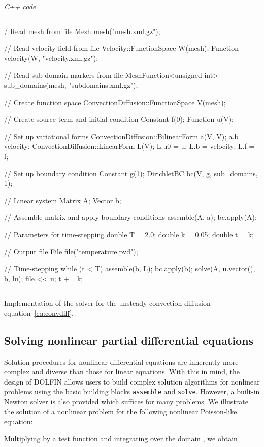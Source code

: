 \documentclass[acmtoms]{acmtrans2m}
\newenvironment{cppcode}[1]{\center\minipage{#1\textwidth}\footnotesize\hfill\it C++ code \rm\vspace{0.1cm}\hrule\renewcommand{\baselinestretch}{0.9}\footnotesize\verbatim}{\endverbatim\hrule\normalsize\endminipage\newline\endcenter}
\newcommand{\emp}[1]{\texttt{#1}}
\newcommand{\dolfin}{DOLFIN}
\begin{document}
\begin{table}
\begin{cppcode}{0.9}
// Read mesh from file
Mesh mesh("mesh.xml.gz");

// Read velocity field from file
Velocity::FunctionSpace W(mesh);
Function velocity(W, "velocity.xml.gz");

// Read sub domain markers from file
MeshFunction<unsigned int> sub_domains(mesh, "subdomains.xml.gz");

// Create function space
ConvectionDiffusion::FunctionSpace V(mesh);

// Create source term and initial condition
Constant f(0);
Function u(V);

// Set up variational forms
ConvectionDiffusion::BilinearForm a(V, V);
a.b = velocity;
ConvectionDiffusion::LinearForm L(V);
L.u0 = u; L.b = velocity; L.f = f;

// Set up boundary condition
Constant g(1);
DirichletBC bc(V, g, sub_domains, 1);

// Linear system
Matrix A;
Vector b;

// Assemble matrix and apply boundary conditions
assemble(A, a);
bc.apply(A);

// Parameters for time-stepping
double T = 2.0; double k = 0.05; double t = k;

// Output file
File file("temperature.pvd");

// Time-stepping
while (t < T)
{
  assemble(b, L);
  bc.apply(b);
  solve(A, u.vector(), b, lu);
  file << u;
  t += k;
}
\end{cppcode}
\caption{Implementation of the solver for the unsteady
convection-diffusion equation~\eqref{eq:convdiff}.}
\label{code:convdiff,dolfin}
\end{table}
\subsection{Solving nonlinear partial differential equations}
\label{sec:nonlinear-pde}
Solution procedures for nonlinear differential equations are
inherently more complex and diverse than those for linear
equations. With this in mind, the design of \dolfin{} allows users to
build complex solution algorithms for nonlinear problems using the
basic building blocks \emp{assemble} and \emp{solve}. However, a
built-in Newton solver is also provided which suffices for many
problems. We illustrate the solution of a nonlinear problem for the
following nonlinear Poisson-like equation:

Multiplying by a test function  and
integrating over the domain , we obtain
\end{document}
